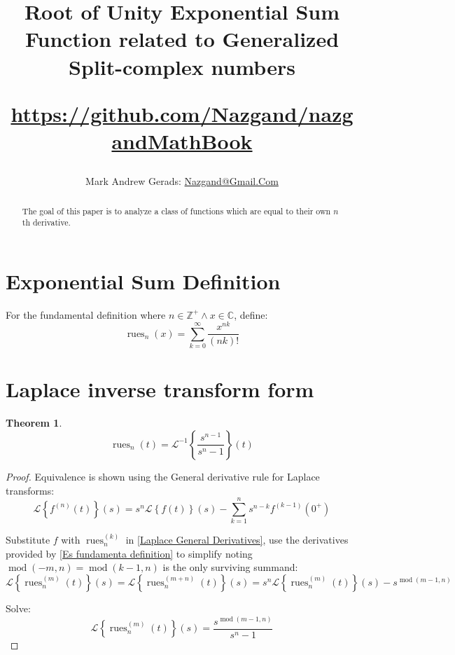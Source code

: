 \documentclass[]{article}
\author{Mark Andrew Gerads: \href{MailTo:Nazgand@Gmail.Com}{Nazgand@Gmail.Com}}
\title{
	Root of Unity Exponential Sum Function related to Generalized Split-complex numbers
	
	\href{https://github.com/Nazgand/nazgandMathBook}{https://github.com/Nazgand/nazgandMathBook}
}
\DeclareMathOperator{\rues}{rues}
\DeclareMathOperator{\md}{mod}
\newcommand{\pqty}[1]{{\left(#1\right)}}
\newcommand{\Bqty}[1]{{\left\{#1\right\}}}
\newcommand{\laplace}[1]{\mathcal{L}\Bqty{#1}\pqty{s}}
\newcommand{\laplaceInv}[1]{\mathcal{L}^{-1}\Bqty{#1}\pqty{t}}
\newtheorem{theorem}{Theorem}[section]
\numberwithin{equation}{section}
\begin{document}
	
	\maketitle
	
	\begin{abstract}
		The goal of this paper is to analyze a class of functions which are equal to their own \(n\)th derivative.
	\end{abstract}
	
	\section{Exponential Sum Definition}
	For the fundamental definition where \(n\in\mathbb{Z}^+\land x\in\mathbb{C}\), define:
	\begin{equation}
	\label{Es fundamenta definition}
	\rues_n\pqty{x}=
	\sum_{k=0}^{\infty}\frac{x^{nk}}{\pqty{nk}!}
	\end{equation}
	
	\section{Laplace inverse transform form}
	\begin{theorem}
			\begin{equation}
		\rues_n\pqty{t}=
		\laplaceInv{\frac{s^{n-1}}{s^n-1}}
		\end{equation}
	\end{theorem}
	\begin{proof}
			Equivalence is shown using the General derivative rule for Laplace transforms:
		\begin{equation}
		\label{Laplace General Derivatives}
		\laplace{f^{(n)}\pqty{t}}=
		s^n \laplace{f\pqty{t}} - \sum_{k=1}^{n} s^{n-k} f^{(k-1)}\pqty{0^{+}}
		\end{equation}
		
		Substitute \(f\) with \(\rues_n^{(k)}\) in \eqref{Laplace General Derivatives}, use the derivatives provided by \eqref{Es fundamenta definition} to simplify noting \(\md\pqty{-m,n}=\md\pqty{k-1,n}\) is the only surviving summand:
		\begin{equation}
		\laplace{\rues_n^{(m)}\pqty{t}}=
		\laplace{\rues_n^{(m+n)}\pqty{t}}=
		s^n\laplace{\rues_n^{(m)}\pqty{t}}-s^{\md\pqty{m-1,n}}
		\end{equation}
		
		Solve:
		\begin{equation}
		\laplace{\rues_n^{(m)}\pqty{t}}=
		\frac{s^{\md\pqty{m-1,n}}}{s^n-1}
		\end{equation}
	\end{proof}
	
\end{document}

